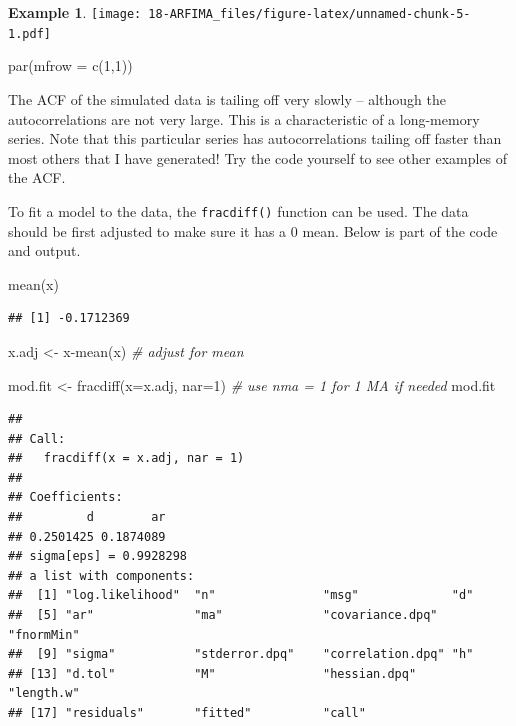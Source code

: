 \documentclass[
]{book}
\newenvironment{Shaded}{\begin{snugshade}}{\end{snugshade}}
\newcommand{\AttributeTok}[1]{\textcolor[rgb]{0.77,0.63,0.00}{#1}}
\newcommand{\CommentTok}[1]{\textcolor[rgb]{0.56,0.35,0.01}{\textit{#1}}}
\newcommand{\DecValTok}[1]{\textcolor[rgb]{0.00,0.00,0.81}{#1}}
\newcommand{\FunctionTok}[1]{\textcolor[rgb]{0.00,0.00,0.00}{#1}}
\newcommand{\NormalTok}[1]{#1}
\newcommand{\OtherTok}[1]{\textcolor[rgb]{0.56,0.35,0.01}{#1}}
\newcommand{\SpecialCharTok}[1]{\textcolor[rgb]{0.00,0.00,0.00}{#1}}
\theoremstyle{definition}
\theoremstyle{definition}
\newtheorem{example}{Example}[chapter]
\theoremstyle{definition}
\theoremstyle{definition}
\theoremstyle{remark}
\begin{document}
\begin{example}
\texttt{[image: 18-ARFIMA\_files/figure-latex/unnamed-chunk-5-1.pdf]}

\begin{Shaded}
\begin{Highlighting}[]
\FunctionTok{par}\NormalTok{(}\AttributeTok{mfrow =} \FunctionTok{c}\NormalTok{(}\DecValTok{1}\NormalTok{,}\DecValTok{1}\NormalTok{))}
\end{Highlighting}
\end{Shaded}

The ACF of the simulated data is tailing off very slowly -- although the autocorrelations are not very large. This is a characteristic of a long-memory series. Note that this particular series has autocorrelations tailing off faster than most others that I have generated! Try the code yourself to see other examples of the ACF.

To fit a model to the data, the \texttt{fracdiff()} function can be used. The data should be first adjusted to make sure it has a 0 mean. Below is part of the code and output.

\begin{Shaded}
\begin{Highlighting}[]
\FunctionTok{mean}\NormalTok{(x)}
\end{Highlighting}
\end{Shaded}

\begin{verbatim}
## [1] -0.1712369
\end{verbatim}

\begin{Shaded}
\begin{Highlighting}[]
\NormalTok{x.adj }\OtherTok{\textless{}{-}}\NormalTok{ x}\SpecialCharTok{{-}}\FunctionTok{mean}\NormalTok{(x) }\CommentTok{\# adjust for mean}
\end{Highlighting}
\end{Shaded}

\begin{Shaded}
\begin{Highlighting}[]
\NormalTok{mod.fit }\OtherTok{\textless{}{-}} \FunctionTok{fracdiff}\NormalTok{(}\AttributeTok{x=}\NormalTok{x.adj, }\AttributeTok{nar=}\DecValTok{1}\NormalTok{)}
\CommentTok{\# use nma = 1 for 1 MA if needed}
\NormalTok{mod.fit}
\end{Highlighting}
\end{Shaded}

\begin{verbatim}
## 
## Call:
##   fracdiff(x = x.adj, nar = 1) 
## 
## Coefficients:
##         d        ar 
## 0.2501425 0.1874089 
## sigma[eps] = 0.9928298 
## a list with components:
##  [1] "log.likelihood"  "n"               "msg"             "d"              
##  [5] "ar"              "ma"              "covariance.dpq"  "fnormMin"       
##  [9] "sigma"           "stderror.dpq"    "correlation.dpq" "h"              
## [13] "d.tol"           "M"               "hessian.dpq"     "length.w"       
## [17] "residuals"       "fitted"          "call"
\end{verbatim}


\end{example}
\end{document}
